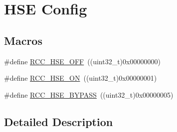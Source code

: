 \hypertarget{group___r_c_c___h_s_e___config}{\section{H\-S\-E Config}
\label{group___r_c_c___h_s_e___config}
}
\subsection*{Macros}
\begin{DoxyCompactItemize}
\item 
\#define \hyperlink{group___r_c_c___h_s_e___config_ga1616626d23fbce440398578855df6f97}{R\-C\-C\-\_\-\-H\-S\-E\-\_\-\-O\-F\-F}~((uint32\-\_\-t)0x00000000)
\item 
\#define \hyperlink{group___r_c_c___h_s_e___config_gabc4f70a44776c557af20496b04d9a9db}{R\-C\-C\-\_\-\-H\-S\-E\-\_\-\-O\-N}~((uint32\-\_\-t)0x00000001)
\item 
\#define \hyperlink{group___r_c_c___h_s_e___config_ga5ca515db2d5c4d5bdb9ee3d154df2704}{R\-C\-C\-\_\-\-H\-S\-E\-\_\-\-B\-Y\-P\-A\-S\-S}~((uint32\-\_\-t)0x00000005)
\end{DoxyCompactItemize}


\subsection{Detailed Description}


